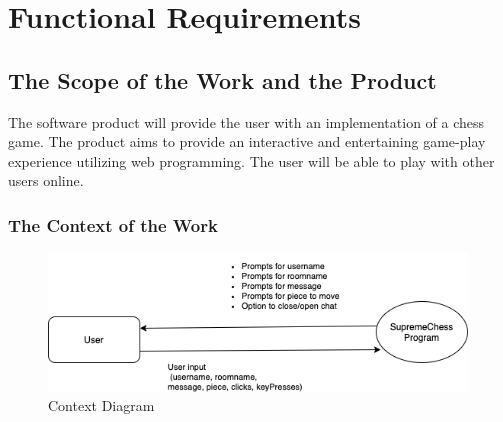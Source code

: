 \documentclass[12pt, titlepage]{article}
\begin{document}
\section{Functional Requirements}

    \subsection{The Scope of the Work and the Product}
        The software product will provide the user with an implementation of a chess game. The product aims to provide an interactive and entertaining game-play experience utilizing web programming. The user will be able to play with other users online.
        
        \subsubsection{The Context of the Work}
            \begin{figure}[h]
                \centering
                \includegraphics[width=30em]{ContextDiagram.png}
                \caption{Context Diagram}
                \label{fig:usecase}
            \end{figure}
\end{document}
